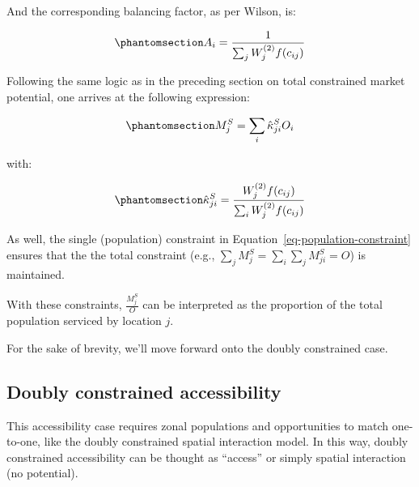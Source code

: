 \documentclass[
]{article}
\begin{document}
And the corresponding balancing factor, as per Wilson, is:

\begin{equation}\phantomsection\label{eq-population-constrained-proportionality-constants}{
A_i = \frac{1}{\sum_j W_j^{(2)} f(c_{ij})}
}\end{equation}

Following the same logic as in the preceding section on total
constrained market potential, one arrives at the following expression:

\begin{equation}\phantomsection\label{eq-production-constrained-accessibility-with-proportional-allocation-factor}{
M^S_{j} = \sum_i \hat \kappa^S_{ji} O_i
}\end{equation}

\noindent with:

\begin{equation}\phantomsection\label{eq-attraction-constrained-proportional-allocation-factor}{
\hat \kappa^S_{ji} = \frac{W_j^{(2)} f(c_{ij})}{\sum_i W_j^{(2)} f(c_{ij})}
}\end{equation}

As well, the single (population) constraint in
Equation~\ref{eq-population-constraint} ensures that the the total
constraint (e.g., \(\sum_j M^S_{j} = \sum_i\sum_j  M^S_{ji} = O\)) is
maintained.

With these constraints, \(\frac{M_j^S}{O}\) can be interpreted as the
proportion of the total population serviced by location \(j\).

For the sake of brevity, we'll move forward onto the doubly constrained
case.

\subsection{Doubly constrained
accessibility}\label{doubly-constrained-accessibility}

This accessibility case requires zonal populations and opportunities to
match one-to-one, like the doubly constrained spatial interaction model.
In this way, doubly constrained accessibility can be thought as
``access'' or simply spatial interaction (no potential).
\end{document}
